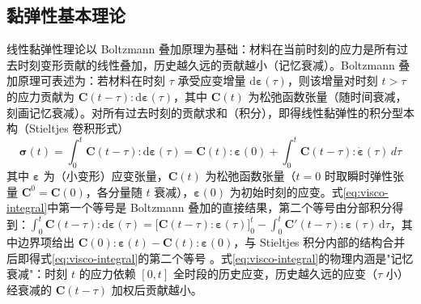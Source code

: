 \subsection{黏弹性基本理论}\label{sec:visco-theory}

线性黏弹性理论以 Boltzmann 叠加原理为基础：材料在当前时刻的应力是所有过去时刻变形贡献的线性叠加，历史越久远的贡献越小（记忆衰减）。Boltzmann 叠加原理可表述为：若材料在时刻 $\tau$ 承受应变增量 $\mathrm{d}\boldsymbol{\varepsilon}(\tau)$，则该增量对时刻 $t>\tau$ 的应力贡献为 $\mathbf{C}(t-\tau):\mathrm{d}\boldsymbol{\varepsilon}(\tau)$，其中 $\mathbf{C}(t)$ 为松弛函数张量（随时间衰减，刻画记忆衰减）。对所有过去时刻的贡献求和（积分），即得线性黏弹性的积分型本构（Stieltjes 卷积形式）
\begin{equation}
  \boldsymbol{\sigma}(t)=\int_{0}^{t}\mathbf{C}(t-\tau):\mathrm{d}\boldsymbol{\varepsilon}(\tau)
  =\mathbf{C}(t):\boldsymbol{\varepsilon}(0)+\int_{0}^{t}\mathbf{C}(t-\tau):\dot{\boldsymbol{\varepsilon}}(\tau)\,d\tau
  \label{eq:visco-integral}
\end{equation}
其中 $\boldsymbol{\varepsilon}$ 为（小变形）应变张量，$\mathbf{C}(t)$ 为松弛函数张量（$t=0$ 时取瞬时弹性张量 $\mathbf{C}^{0}=\mathbf{C}(0)$，各分量随 $t$ 衰减），$\boldsymbol{\varepsilon}(0)$ 为初始时刻的应变。式\eqref{eq:visco-integral}中第一个等号是 Boltzmann 叠加的直接结果，第二个等号由分部积分得到：$\int_{0}^{t}\mathbf{C}(t-\tau):\mathrm{d}\boldsymbol{\varepsilon}(\tau)=\bigl[\mathbf{C}(t-\tau):\boldsymbol{\varepsilon}(\tau)\bigr]_{0}^{t}-\int_{0}^{t}\mathbf{C}'(t-\tau):\boldsymbol{\varepsilon}(\tau)\,\mathrm{d}\tau$，其中边界项给出 $\mathbf{C}(0):\boldsymbol{\varepsilon}(t)-\mathbf{C}(t):\boldsymbol{\varepsilon}(0)$，与 Stieltjes 积分内部的结构合并后即得式\eqref{eq:visco-integral}的第二个等号 \cite{Christensen1982}。式\eqref{eq:visco-integral}的物理内涵是"记忆衰减"：时刻 $t$ 的应力依赖 $[0,t]$ 全时段的历史应变，历史越久远的应变（$\tau$ 小）经衰减的 $\mathbf{C}(t-\tau)$ 加权后贡献越小。

